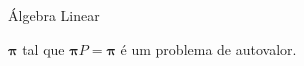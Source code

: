 \documentclass{beamer}
\begin{document}

\begin{frame}[c]{Álgebra Linear}

  \begin{center}
    \( \bm\pi \) tal que \( \bm\pi P = \bm\pi \)   é um problema de autovalor.
  \end{center}
  
\end{frame}

\end{document}
